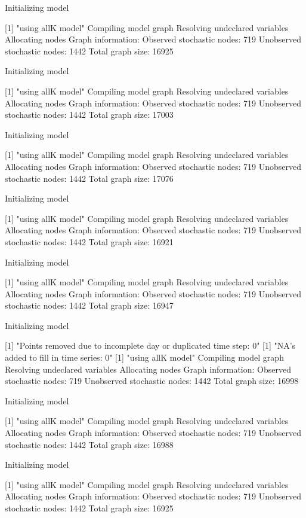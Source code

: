 \documentclass[11pt,lineno]{manuscript}\usepackage[]{graphicx}\usepackage[]{xcolor}
\begin{document}
Initializing model

[1] "using allK model"
Compiling model graph
   Resolving undeclared variables
   Allocating nodes
Graph information:
   Observed stochastic nodes: 719
   Unobserved stochastic nodes: 1442
   Total graph size: 16925

Initializing model

[1] "using allK model"
Compiling model graph
   Resolving undeclared variables
   Allocating nodes
Graph information:
   Observed stochastic nodes: 719
   Unobserved stochastic nodes: 1442
   Total graph size: 17003

Initializing model

[1] "using allK model"
Compiling model graph
   Resolving undeclared variables
   Allocating nodes
Graph information:
   Observed stochastic nodes: 719
   Unobserved stochastic nodes: 1442
   Total graph size: 17076

Initializing model

[1] "using allK model"
Compiling model graph
   Resolving undeclared variables
   Allocating nodes
Graph information:
   Observed stochastic nodes: 719
   Unobserved stochastic nodes: 1442
   Total graph size: 16921

Initializing model

[1] "using allK model"
Compiling model graph
   Resolving undeclared variables
   Allocating nodes
Graph information:
   Observed stochastic nodes: 719
   Unobserved stochastic nodes: 1442
   Total graph size: 16947

Initializing model

[1] "Points removed due to incomplete day or duplicated time step: 0"
[1] "NA's added to fill in time series: 0"
[1] "using allK model"
Compiling model graph
   Resolving undeclared variables
   Allocating nodes
Graph information:
   Observed stochastic nodes: 719
   Unobserved stochastic nodes: 1442
   Total graph size: 16998

Initializing model

[1] "using allK model"
Compiling model graph
   Resolving undeclared variables
   Allocating nodes
Graph information:
   Observed stochastic nodes: 719
   Unobserved stochastic nodes: 1442
   Total graph size: 16988

Initializing model

[1] "using allK model"
Compiling model graph
   Resolving undeclared variables
   Allocating nodes
Graph information:
   Observed stochastic nodes: 719
   Unobserved stochastic nodes: 1442
   Total graph size: 16925
\end{document}
